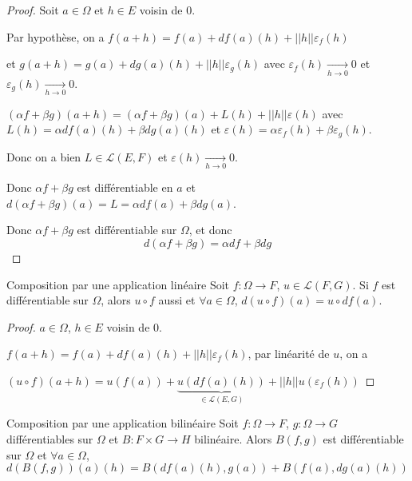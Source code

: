 \begin{proof}
    Soit $a \in \Omega$ et $h \in E$ voisin de $0$.

    Par hypothèse, on a $f(a + h) = f(a) + df(a)(h) + ||h|| \varepsilon_f(h)$

    et $g(a + h) = g(a) + dg(a)(h) + ||h|| \varepsilon_g(h)$ 
    avec $\varepsilon_f(h) \xrightarrow[h \to 0 ]{} 0$ et $\varepsilon_g(h) \xrightarrow[h \to 0 ]{} 0$.

    $(\alpha f + \beta g)(a + h) = (\alpha f + \beta g)(a) + L(h) + ||h|| \varepsilon (h)$ avec 
    $L(h) = \alpha df(a)(h) + \beta dg(a)(h)$ et $\varepsilon (h) = \alpha \varepsilon_f(h) + \beta \varepsilon_g(h)$.

    Donc on a bien $L \in \mathscr L(E, F)$ et $\varepsilon(h) \xrightarrow[h \to 0 ]{} 0$.

    Donc $\alpha f + \beta g$ est différentiable en $a$ et $d(\alpha f + \beta g)(a) = L = \alpha df(a) + \beta dg(a)$.

    Donc $\alpha f + \beta g$ est différentiable sur $\Omega$, et donc 
    $$d(\alpha f + \beta g) = \alpha df + \beta dg$$
\end{proof}

\begin{proposition}{Composition par une application linéaire}{}
    Soit $f : \Omega \to F$, $u \in \mathscr L(F, G)$. Si 
    $f$ est différentiable sur $\Omega$, alors $u \circ f$ aussi et 
    $\forall a \in \Omega$, $d(u \circ f)(a) = u \circ df(a)$.
\end{proposition}

\begin{proof}
    $a \in \Omega$, $h \in E$ voisin de $0$.

    $f(a + h) = f(a) + df(a)(h) + ||h|| \varepsilon_f(h)$, par linéarité de $u$, on a

    $(u \circ f)(a + h) = u(f(a)) + \underbrace{u(df(a)(h))}_{\in \mathscr L(E, G)} + ||h|| u(\varepsilon_f(h))$
\end{proof}

\begin{proposition}{Composition par une application bilinéaire}{}
    Soit $f : \Omega \to F$, $g : \Omega \to G$ différentiables sur $\Omega$ et 
    $B : F \times G \to H$ bilinéaire. Alors $B(f, g)$ est différentiable sur $\Omega$ et 
    $\forall a \in \Omega$,
    $$d(B(f, g))(a)(h) = B(df(a)(h), g(a)) + B(f(a), dg(a)(h))$$
\end{proposition}


